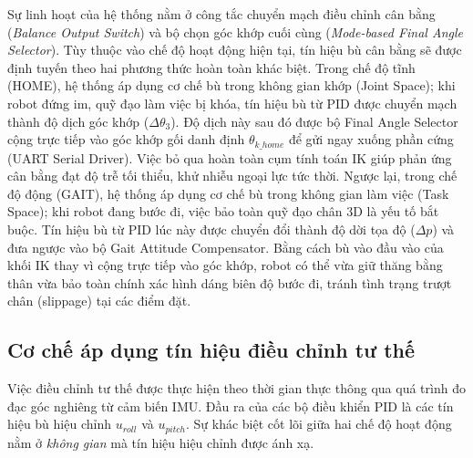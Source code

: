 Sự linh hoạt của hệ thống nằm ở công tắc chuyển mạch điều chỉnh cân bằng (\textit{Balance Output Switch}) và bộ chọn góc khớp cuối cùng (\textit{Mode-based Final Angle Selector}). Tùy thuộc vào chế độ hoạt động hiện tại, tín hiệu bù cân bằng sẽ được định tuyến theo hai phương thức hoàn toàn khác biệt. Trong chế độ tĩnh (HOME), hệ thống áp dụng cơ chế bù trong không gian khớp (Joint Space); khi robot đứng im, quỹ đạo làm việc bị khóa, tín hiệu bù từ PID được chuyển mạch thành độ dịch góc khớp ($\Delta\theta_3$). Độ dịch này sau đó được bộ Final Angle Selector cộng trực tiếp vào góc khớp gối danh định $\theta_{k\_home}$ để gửi ngay xuống phần cứng (UART Serial Driver). Việc bỏ qua hoàn toàn cụm tính toán IK giúp phản ứng cân bằng đạt độ trễ tối thiểu, khử nhiễu ngoại lực tức thời. Ngược lại, trong chế độ động (GAIT), hệ thống áp dụng cơ chế bù trong không gian làm việc (Task Space); khi robot đang bước đi, việc bảo toàn quỹ đạo chân 3D là yếu tố bắt buộc. Tín hiệu bù từ PID lúc này được chuyển đổi thành độ dời tọa độ ($\Delta p$) và đưa ngược vào bộ Gait Attitude Compensator. Bằng cách bù vào đầu vào của khối IK thay vì cộng trực tiếp vào góc khớp, robot có thể vừa giữ thăng bằng thân vừa bảo toàn chính xác hình dáng biên độ bước đi, tránh tình trạng trượt chân (slippage) tại các điểm đặt.

\subsection{Cơ chế áp dụng tín hiệu điều chỉnh tư thế}
Việc điều chỉnh tư thế được thực hiện theo thời gian thực thông qua quá trình đo đạc góc nghiêng từ cảm biến IMU. Đầu ra của các bộ điều khiển PID là các tín hiệu bù hiệu chỉnh $u_{roll}$ và $u_{pitch}$. Sự khác biệt cốt lõi giữa hai chế độ hoạt động nằm ở \textit{không gian} mà tín hiệu hiệu chỉnh được ánh xạ.

